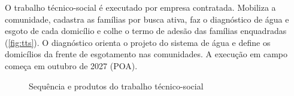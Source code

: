 O trabalho técnico-social é executado por empresa contratada. Mobiliza a
comunidade, cadastra as famílias por busca ativa, faz o diagnóstico de água e
esgoto de cada domicílio e colhe o termo de adesão das famílias enquadradas
(\autoref{fig:tts}). O diagnóstico orienta o projeto do sistema de água e
define os domicílios da frente de esgotamento nas comunidades. A execução em
campo começa em outubro de 2027 (POA).

\begin{figure}[htbp]
  \centering
  \caption{Sequência e produtos do trabalho técnico-social}
  \label{fig:tts}
\end{figure}

